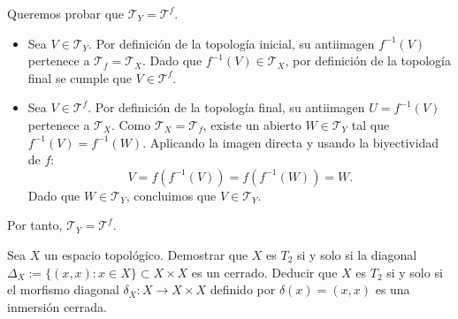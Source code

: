 \begin{sol}
\begin{itemize}
\begin{itemize}
        Queremos probar que $\mathcal{T}_Y = \mathcal{T}^f$.
        \begin{itemize}
            \item[$(\subseteq)$] Sea $V \in \mathcal{T}_Y$. Por definición de la topología inicial, su antiimagen $f^{-1}(V)$ pertenece a $\mathcal{T}_f = \mathcal{T}_X$. Dado que $f^{-1}(V) \in \mathcal{T}_X$, por definición de la topología final se cumple que $V \in \mathcal{T}^f$.
            \item[$(\supseteq)$] Sea $V \in \mathcal{T}^f$. Por definición de la topología final, su antiimagen $U = f^{-1}(V)$ pertenece a $\mathcal{T}_X$. Como $\mathcal{T}_X = \mathcal{T}_f$, existe un abierto $W \in \mathcal{T}_Y$ tal que $f^{-1}(V) = f^{-1}(W)$. Aplicando la imagen directa y usando la biyectividad de $f$:
            \[
                V = f(f^{-1}(V)) = f(f^{-1}(W)) = W.
            \]
            Dado que $W \in \mathcal{T}_Y$, concluimos que $V \in \mathcal{T}_Y$.
        \end{itemize}
        Por tanto, $\mathcal{T}_Y = \mathcal{T}^f$.
                \end{itemize}
        \end{itemize}
\end{sol}
\begin{ejer}
    [98] Sea $X$ un espacio topológico. Demostrar que $X$ es $T_2$ si y solo si la diagonal $\Delta_X := \{(x,x): x \in X\} \subset X\times X$ es un cerrado. Deducir que $X$ es $T_2$ si y solo si el morfismo diagonal $\delta_X: X \longrightarrow X \times X$ definido por $\delta(x) = (x, x)$ es una inmersión cerrada.
\end{ejer}
